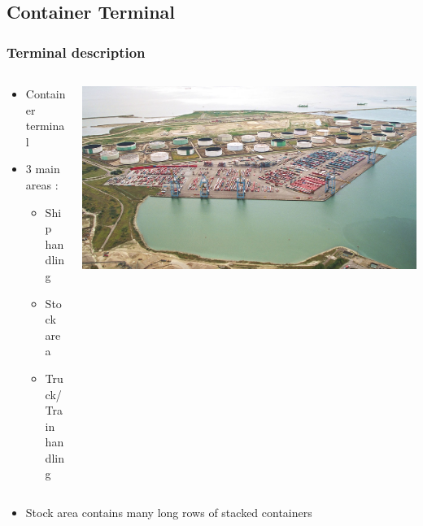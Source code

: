 \documentclass{beamer}
\begin{document}
\begin{frame}
\end{frame}
\subsection*{Container Terminal}
\begin{frame}
\frametitle{Terminal description}

 	\begin{columns}
 	 	\begin{column}[l]{4cm}
			\begin{itemize}
				\item Container terminal
				\item 3 main areas : 
				\begin{itemize}
 					\item Ship handling
					\item Stock area
					\item Truck/Train handling
				\end{itemize}
			\end{itemize}
		\end{column}
 	 	\begin{column}[r]{8cm}
			\begin{flushright}
				\includegraphics[height=.55\textheight]{fig/terminalDeNormandie.jpg}
			\end{flushright}
		\end{column}
 	\end{columns}
\begin{itemize}
\item Stock area contains many long rows of stacked containers
\end{itemize}
\end{frame}
\end{document}

